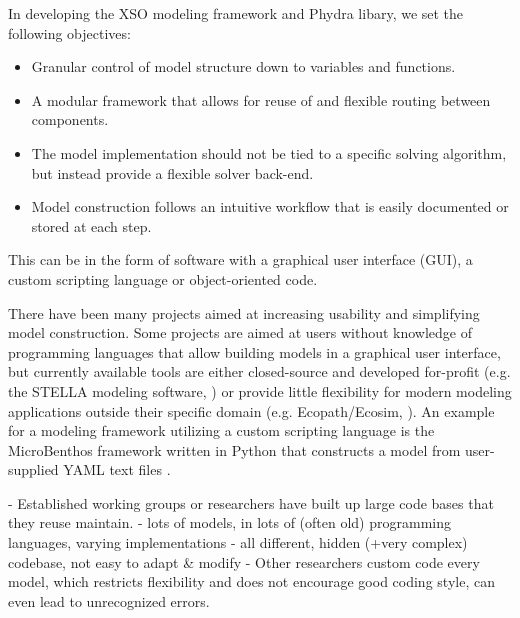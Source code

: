 \documentclass[journal abbreviation, manuscript]{copernicus}
\begin{document}
In developing the XSO modeling framework and Phydra libary, we set the following objectives:
\begin{itemize}
    \item Granular control of model structure down to variables and functions.
    \item A modular framework that allows for reuse of and flexible routing between components.
    \item The model implementation should not be tied to a specific solving algorithm, but instead provide a flexible solver back-end.
    \item Model construction follows an intuitive workflow that is easily documented or stored at each step.
\end{itemize}


 This can be in the form of software with a graphical user interface (GUI), a custom scripting language or object-oriented code.

There have been many projects aimed at increasing usability and simplifying model construction. Some projects are aimed at users without knowledge of programming languages that allow building models in a graphical user interface, but currently available tools are either closed-source and developed for-profit (e.g. the STELLA modeling software, \citep{Costanza2001ModelingIII}) or provide little flexibility for modern modeling applications outside their specific domain (e.g. Ecopath/Ecosim, \citep{Coll2009EcosystemApproach}).
An example for a modeling framework utilizing a custom scripting language is the MicroBenthos framework written in Python that constructs a model from user-supplied YAML text files \citep{Chennu2018MicroBenthos:Ecology}. 





- Established working groups or researchers have built up large code bases that they reuse maintain.
- lots of models, in lots of (often old) programming languages, varying implementations
- all different, hidden (+very complex) codebase, not easy to adapt \& modify
- Other researchers custom code every model, which restricts flexibility and does not encourage good coding style, can even lead to unrecognized errors.
\end{document}
